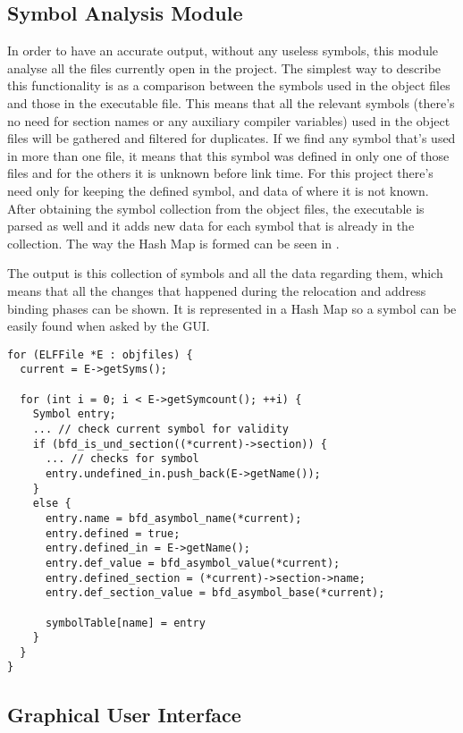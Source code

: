 \subsection{Symbol Analysis Module}
\label{sub-sec:sym-mod}

In order to have an accurate output, without any useless symbols, this module analyse all the files currently open in the project. The simplest way to describe this functionality is as a comparison between the symbols used in the object files and those in the executable file. This means that all the relevant symbols (there's no need for section names or any auxiliary compiler variables) used in the object files will be gathered and filtered for duplicates. If we find any symbol that's used in more than one file, it means that this symbol was defined in only one of those files and for the others it is unknown before link time. For this project there's need only for keeping the defined symbol, and data of where it is not known. After obtaining the symbol collection from the object files, the executable is parsed as well and it adds new data for each symbol that is already in the collection. The way the Hash Map is formed can be seen in .

The output is this collection of symbols and all the data regarding them, which means that all the changes that happened during the relocation and address binding phases can be shown. It is represented in a Hash Map so a symbol can be easily found when asked by the GUI.

\bigbreak
\lstset{language=c++,caption=Symbol selection from object files,label=lst:sym-code}
\begin{lstlisting}
for (ELFFile *E : objfiles) {
  current = E->getSyms();
  
  for (int i = 0; i < E->getSymcount(); ++i) {
    Symbol entry;
    ... // check current symbol for validity
    if (bfd_is_und_section((*current)->section)) {
      ... // checks for symbol
      entry.undefined_in.push_back(E->getName());
    }
    else {
      entry.name = bfd_asymbol_name(*current); 
      entry.defined = true;
      entry.defined_in = E->getName();
      entry.def_value = bfd_asymbol_value(*current);
      entry.defined_section = (*current)->section->name;
      entry.def_section_value = bfd_asymbol_base(*current);
      
      symbolTable[name] = entry
    }
  }
}
\end{lstlisting}

\subsection{Graphical User Interface}
\label{sub-sec:gui-mod}

